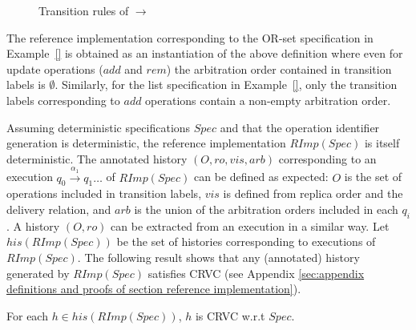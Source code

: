 \begin{figure}[ht]
\caption{Transition rules of $\rightarrow$}
\label{fig:transition rules of RImpSpec}
\end{figure}

The reference implementation corresponding to the OR-set specification in Example~\ref{} is obtained as an instantiation of the above definition where even for update operations ($\mathit{add}$ and $\mathit{rem}$) the arbitration order contained in transition labels is $\emptyset$. Similarly, for the list specification in Example~\ref{}, only the transition labels corresponding to $\mathit{add}$ operations contain a non-empty arbitration order.

%
%
%
%

Assuming deterministic specifications $\mathit{Spec}$ and that the operation identifier generation is deterministic, the reference implementation $\mathit{RImp}(\mathit{Spec})$ is itself deterministic.
The annotated history $(O,\mathit{ro},\mathit{vis},\mathit{arb})$ corresponding to an execution $q_0 {\xrightarrow{\alpha_1}} q_1 \ldots$ of $\mathit{RImp}(\mathit{Spec})$ can be defined as expected: $O$ is the set of operations included in transition labels, $\mathit{vis}$ is defined from replica order and the delivery relation, and $\mathit{arb}$ is the union of the arbitration orders included in each $q_i$. A history $(O,\mathit{ro})$ can be extracted from an execution in a similar way. Let $\mathit{his}(\mathit{RImp}(\mathit{Spec}))$ be the set of histories corresponding to executions of $\mathit{RImp}(\mathit{Spec})$. The following result shows that any (annotated) history generated by $\mathit{RImp}(\mathit{Spec})$ satisfies CRVC (see Appendix \ref{sec:appendix definitions and proofs of section reference implementation}).

\begin{theorem}
\label{theorem:histories of reference implementation are SRV consistent}
For each $h \in \mathit{his}(\mathit{RImp}(\mathit{Spec}))$, $h$ is CRVC w.r.t $\mathit{Spec}$.
\end{theorem}

